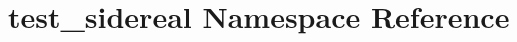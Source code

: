 \hypertarget{namespacetest__sidereal}{\section{test\-\_\-sidereal Namespace Reference}
\label{namespacetest__sidereal}
}
